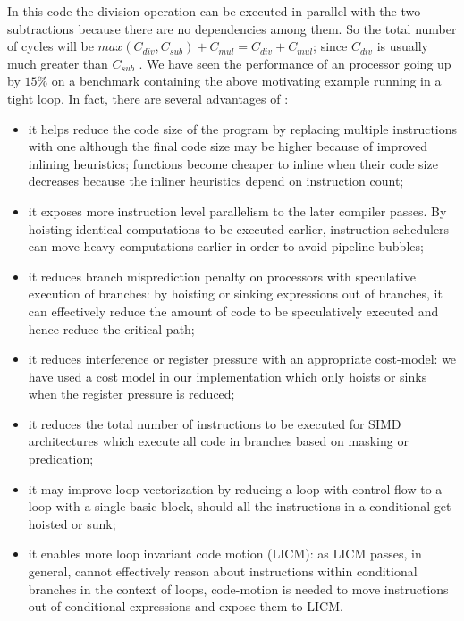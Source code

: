\documentclass[acmlarge,review,anonymous]{acmart}\settopmatter{printfolios=true}
\begin{document}
In this code the division operation can be executed in parallel with the two
subtractions because there are no dependencies among them. So the total number
of cycles will be $max(C_{div}, C_{sub}) + C_{mul} = C_{div} + C_{mul}$; since
$C_{div}$ is usually much greater than $C_{sub}$ \cite{x86,aarch64}. We have
seen the performance of an \ooo{} processor going up by $15\%$ on a benchmark
containing the above motivating example running in a tight loop.  In fact, there
are several advantages of \GCM{}:
\begin{itemize}
\item it helps reduce the code size of the program by replacing multiple
  instructions with one although the final code size may be higher because of
  improved inlining heuristics; functions become cheaper to inline when their
  code size decreases because the inliner heuristics depend on instruction
  count;
\item it exposes more instruction level parallelism to the later compiler
  passes. By hoisting identical computations to be executed earlier, instruction
  schedulers can move heavy computations earlier in order to avoid pipeline
  bubbles;
\item it reduces branch misprediction penalty on \ooo{} processors with
  speculative execution of branches: by hoisting or sinking expressions out of
  branches, it can effectively reduce the amount of code to be speculatively
  executed and hence reduce the critical path;
\item it reduces interference or register pressure with an appropriate
  cost-model: we have used a cost model in our implementation which only hoists
  or sinks when the register pressure is reduced;
\item it reduces the total number of instructions to be executed for SIMD
  architectures which execute all code in branches based on masking or
  predication;
\item it may improve loop vectorization by reducing a loop with control flow to
  a loop with a single basic-block, should all the instructions in a conditional get
  hoisted or sunk;
\item it enables more loop invariant code motion (LICM): as LICM passes, in
  general, cannot effectively reason about instructions within conditional
  branches in the context of loops, code-motion is needed to move instructions
  out of conditional expressions and expose them to LICM.
\end{itemize}
\end{document}
